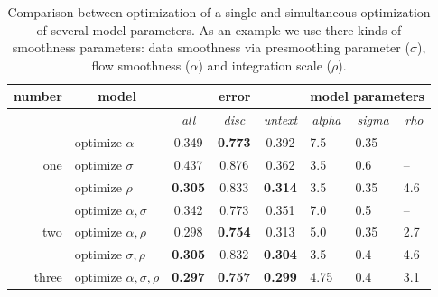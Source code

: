 \begin{table}[ht] \scriptsize
  \centering
  \caption{Comparison between optimization of a single and simultaneous optimization of several model parameters. As an example we use there kinds of smoothness parameters: data smoothness via presmoothing parameter ($\sigma$), flow smoothness ($\alpha$) and integration scale ($\rho$).}
    \begin{tabular}{rrcrrrrr}
    \toprule
    number & \multicolumn{1}{c}{model} & \multicolumn{3}{c}{error} & \multicolumn{3}{c}{model parameters} \\
    \midrule
              &       & \textit{all} & \multicolumn{1}{c}{\textit{disc}} & \multicolumn{1}{c}{\textit{untext}} & \multicolumn{1}{c}{\textit{alpha}} & \multicolumn{1}{c}{\textit{sigma}} & \multicolumn{1}{c}{\textit{rho}} \\
          \midrule
          \midrule
          
    \multirow{3}[0]{*}{one } & \multicolumn{1}{l}{optimize $\alpha$} & 0.349 & \multicolumn{1}{c}{\textbf{0.773}} & \multicolumn{1}{c}{0.392} & \multicolumn{1}{l}{7.5} & \multicolumn{1}{l}{0.35} & \multicolumn{1}{l}{--} \\
          & \multicolumn{1}{l}{optimize $\sigma$} & 0.437 & \multicolumn{1}{c}{0.876} & \multicolumn{1}{c}{0.362} & \multicolumn{1}{l}{3.5} & \multicolumn{1}{l}{0.6} & \multicolumn{1}{l}{--} \\      
              & \multicolumn{1}{l}{optimize $\rho$} & \textbf{0.305} & \multicolumn{1}{c}{0.833} & \multicolumn{1}{c}{\textbf{0.314}} & \multicolumn{1}{l}{3.5} & \multicolumn{1}{l}{0.35} & \multicolumn{1}{l}{4.6} \\
          
          \midrule
    \multirow{3}[0]{*}{two} & \multicolumn{1}{l}{optimize $\alpha, \sigma$} & 0.342 & \multicolumn{1}{c}{0.773} & \multicolumn{1}{c}{0.351} & \multicolumn{1}{l}{7.0} & \multicolumn{1}{l}{0.5} & \multicolumn{1}{l}{--} \\
    
          & \multicolumn{1}{l}{optimize $\alpha, \rho$} & 0.298 & \multicolumn{1}{c}{\textbf{0.754}} & \multicolumn{1}{c}{0.313} & \multicolumn{1}{l}{5.0} & \multicolumn{1}{l}{0.35} & \multicolumn{1}{l}{2.7} \\
          & \multicolumn{1}{l}{optimize $\sigma, \rho$} & \textbf{0.305} & \multicolumn{1}{c}{0.832} & \multicolumn{1}{c}{\textbf{0.304}} & \multicolumn{1}{l}{3.5} & \multicolumn{1}{l}{0.4} & \multicolumn{1}{l}{4.6} \\
          
          \midrule
          
    three   & \multicolumn{1}{l}{optimize $\alpha, \sigma, \rho$} & \textbf{0.297} & \multicolumn{1}{c}{\textbf{0.757}} & \multicolumn{1}{c}{\textbf{0.299}} & \multicolumn{1}{l}{4.75} & \multicolumn{1}{l}{0.4} & \multicolumn{1}{l}{3.1} \\
    \bottomrule
    \end{tabular}%
  \label{tab:exp_smooth3}%
\end{table}%




